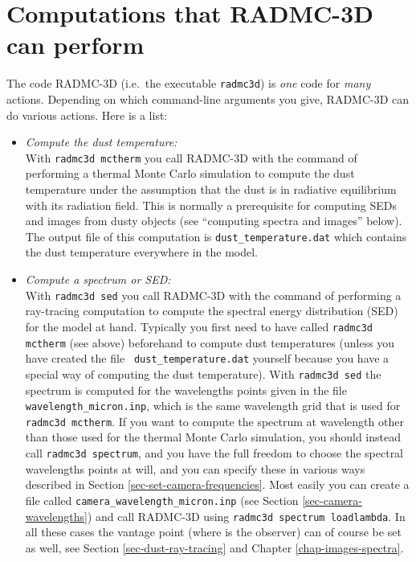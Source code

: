\documentclass{report}
\begin{document}
\section{Computations that RADMC-3D can perform}
\label{sec-actions}
%
The code RADMC-3D (i.e.\ the executable {\small\tt radmc3d}) is {\em one}
code for {\em many} actions. Depending on which command-line arguments you
give, RADMC-3D can do various actions. Here is a list:
\begin{itemize}
\item {\em Compute the dust temperature:}\\
  With {\small\tt radmc3d mctherm} you call RADMC-3D with the command of
  performing a thermal Monte Carlo simulation to compute the dust temperature
  under the assumption that the dust is in radiative equilibrium with its
  radiation field. This is normally a prerequisite for computing SEDs and
  images from dusty objects (see ``computing spectra and images'' below).
  The output file of this computation is {\small\tt dust\_temperature.dat}
  which contains the dust temperature everywhere in the model.
\item {\em Compute a spectrum or SED:}\\
  With {\small\tt radmc3d sed} you call RADMC-3D with the command of
  performing a ray-tracing computation to compute the spectral energy
  distribution (SED) for the model at hand. Typically you first need to have
  called {\small\tt radmc3d mctherm} (see above) beforehand to compute dust
  temperatures (unless you have created the file {\small\tt
    dust\_temperature.dat} yourself because you have a special way of
  computing the dust temperature). With {\small\tt radmc3d sed} the spectrum
  is computed for the wavelengths points given in the file {\small\tt
    wavelength\_micron.inp}, which is the same wavelength grid that is used
  for {\small\tt radmc3d mctherm}. If you want to compute the spectrum at
  wavelength other than those used for the thermal Monte Carlo simulation,
  you should instead call {\small\tt radmc3d spectrum}, and you have the
  full freedom to choose the spectral wavelengths points at will, and you
  can specify these in various ways described in Section
  \ref{sec-set-camera-frequencies}.  Most easily you can create a file
  called {\small\tt camera\_wavelength\_micron.inp} (see Section
  \ref{sec-camera-wavelengths}) and call RADMC-3D using {\small\tt radmc3d
    spectrum loadlambda}. In all these cases the vantage point (where is the
  observer) can of course be set as well, see Section
  \ref{sec-dust-ray-tracing} and Chapter \ref{chap-images-spectra}.

\end{itemize}
\end{document}
